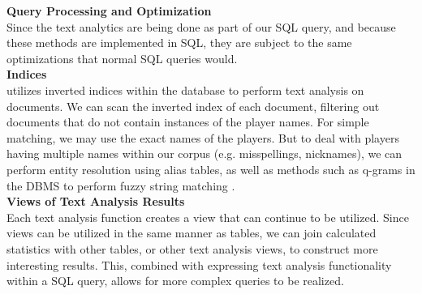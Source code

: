 \noindent
\textbf{Query Processing and Optimization} \\
Since the text analytics are being done as part of our SQL query, and because
these methods are implemented in SQL, they are subject to the same optimizations
that normal SQL queries would. \\


\noindent
\textbf{Indices}\\
{\system} utilizes inverted indices within the database to perform text
analysis on documents. We can scan the inverted index of each 
document, filtering
out documents that do not contain instances of the player names.
For simple matching, we may use the exact names of the players. But to
deal with players having multiple names within our corpus (e.g. misspellings,
nicknames), we can perform entity
resolution using alias tables, as well as methods such as q-grams in the DBMS to perform fuzzy string
matching \cite{Jain:2009:BQO:1519103.1519108}.\\

\noindent
\textbf{Views of Text Analysis Results}\\
Each text analysis function creates a view that can continue to be utilized.
Since views can be utilized in the same manner as tables, we can join calculated
statistics with other tables, or other text analysis views, to construct more
interesting results. This, combined with expressing text analysis functionality
within a SQL query, allows for more complex queries to be realized. \\



